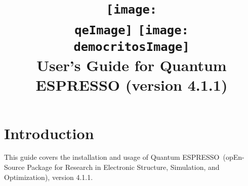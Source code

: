 \documentclass[12pt,a4paper]{article}
\def\version{4.1.1}
\def\qe{{\sc Quantum ESPRESSO}}
\begin{document}
 
\author{}
\date{}

\def\qeImage{quantum_espresso.pdf}
\def\democritosImage{democritos.pdf}

\begin{htmlonly}
\def\qeImage{quantum_espresso.png}
\def\democritosImage{democritos.png}
\end{htmlonly}

\title{
  \texttt{[image: \\qeImage]} \hskip 2cm
  \texttt{[image: \\democritosImage]}\\
  \vskip 1cm
  \Huge User's Guide for \qe \smallskip
  \Large (version \version)
}


\maketitle

\tableofcontents

\section{Introduction}

This guide covers the installation and usage of \qe\ (opEn-Source 
Package for Research in Electronic Structure, Simulation,
and Optimization), version \version.
\end{document}
